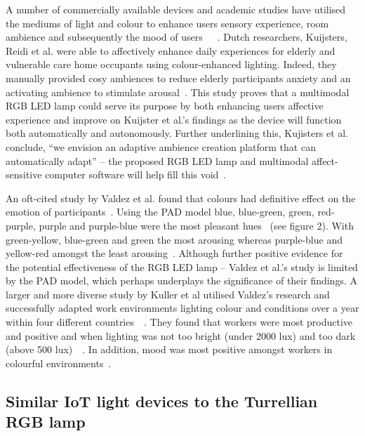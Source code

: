 \documentclass{sigchi}
\begin{document}
A number of commercially available devices and academic studies have utilised the mediums of light and colour to enhance users sensory experience, room ambience and subsequently the mood of users~\cite{flores2017effect}~\cite{kuijsters2011improving}~\cite{kuijsters2015lighting}. Dutch researchers, Kuijsters, Reidi et al. were able to affectively enhance daily experiences for elderly and vulnerable care home occupants using colour-enhanced lighting. Indeed, they manually provided cosy ambiences to reduce elderly participants anxiety and an activating ambience to stimulate arousal~\cite{kuijsters2015lighting}. This study proves that a multimodal RGB LED lamp could serve its purpose by both enhancing users affective experience and improve on Kuijster et al.’s findings as the device will function both automatically and autonomously. Further underlining this, Kujisters et al. conclude, “we envision an adaptive ambience creation platform that can automatically adapt” – the proposed RGB LED lamp and multimodal affect-sensitive computer software will help fill this void~\cite{kuijsters2015lighting}.

An oft-cited study by Valdez et al. found that colours had definitive effect on the emotion of participants~\cite{valdez1994effects}. Using the PAD model blue, blue-green, green, red-purple, purple and purple-blue were the most pleasant hues~\cite{valdez1994effects} (see figure 2). With green-yellow, blue-green and green the most arousing whereas purple-blue and yellow-red amongst the least arousing~\cite{valdez1994effects}. Although further positive evidence for the potential effectiveness of the RGB LED lamp – Valdez et al.’s study is limited by the PAD model, which perhaps underplays the significance of their findings. A larger and more diverse study by Kuller et al utilised Valdez’s research and successfully adapted work environments lighting colour and conditions over a year within four different countries~\cite{kuller2006impact}~\cite{kuller2009color}. They found that workers were most productive and positive and when lighting was not too bright (under 2000 lux) and too dark (above 500 lux)~\cite{kuller2006impact}~\cite{kuller2009color}. In addition, mood was most positive amongst workers in colourful environments~\cite{kuller1986physiological}.

\subsection{Similar IoT light devices to the Turrellian RGB lamp}
\end{document}
